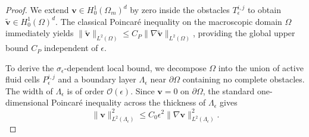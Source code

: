 \documentclass{elsarticle}
\begin{document}
\begin{proof}
    We extend $\mathbf{v} \in H_0^1(\Omega_m)^d$ by zero inside the obstacles $T_{\epsilon}^{i,j}$ to obtain $\tilde{\mathbf{v}} \in H_0^1(\Omega)^d$. The classical Poincaré inequality on the macroscopic domain $\Omega$ immediately yields $\|\tilde{\mathbf{v}}\|_{L^2(\Omega)} \le C_P \|\nabla \tilde{\mathbf{v}}\|_{L^2(\Omega)}$, providing the global upper bound $C_P$ independent of $\epsilon$.

    To derive the $\sigma_\epsilon$-dependent local bound, we decompose $\Omega$ into the union of active fluid cells $P_\epsilon^{i,j}$ and a boundary layer $\Lambda_{\epsilon}$ near $\partial \Omega$ containing no complete obstacles. The width of $\Lambda_{\epsilon}$ is of order $\mathcal{O}(\epsilon)$. Since $\mathbf{v} = 0$ on $\partial \Omega$, the standard one-dimensional Poincaré inequality across the thickness of $\Lambda_{\epsilon}$ gives
    \begin{equation}
        \|\mathbf{v}\|_{L^2(\Lambda_{\epsilon})}^2 \le C_0 \epsilon^2 \|\nabla \mathbf{v}\|_{L^2(\Lambda_{\epsilon})}^2.
    \end{equation}


\end{proof}
\end{document}
